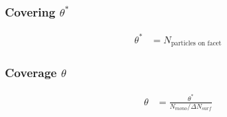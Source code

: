 \subsubsection*{Covering $\theta^*$}
\begin{equation}
	\begin{split}
		\theta^*&=N_{\text{particles on facet}}
	\end{split}
\end{equation}

\subsubsection*{Coverage $\theta$}
\begin{equation}
	\label{eq:cov}
	\begin{split}
		\theta&=\frac{\theta^*}{N_{mono}/\Delta N_{surf}}
	\end{split}
\end{equation}

%
%

